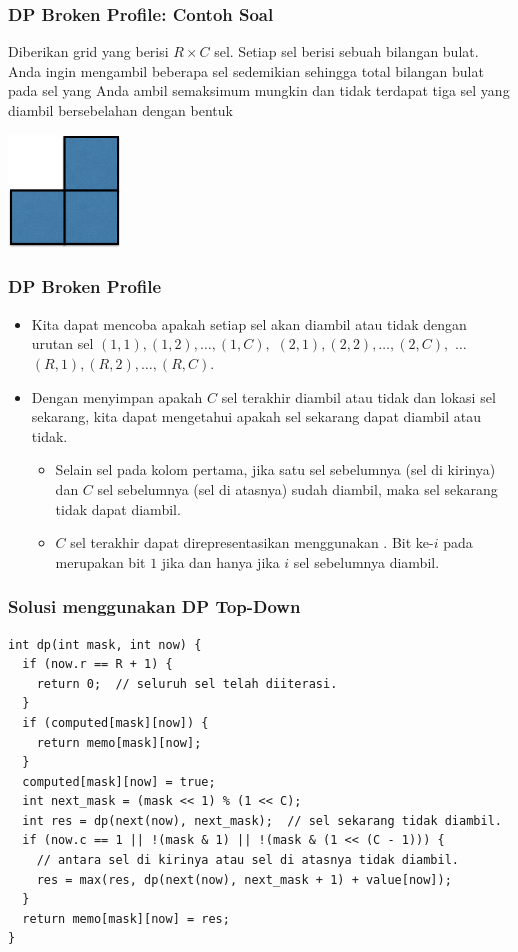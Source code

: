 \begin{frame}
\frametitle{DP Broken Profile: Contoh Soal}
Diberikan grid yang berisi $R \times C$ sel. Setiap sel berisi sebuah bilangan bulat. Anda ingin mengambil beberapa sel sedemikian sehingga total bilangan bulat pada sel yang Anda ambil semaksimum mungkin dan tidak terdapat tiga sel yang diambil bersebelahan dengan bentuk
\newline
\begin{center}
\includegraphics[width=3cm]{asset/shape.png}
\end{center}
\end{frame}

\begin{frame}
\frametitle{DP Broken Profile}
\begin{itemize}
  \item Kita dapat mencoba apakah setiap sel akan diambil atau tidak dengan urutan sel
  \newline
  $(1, 1), (1, 2), \dots, (1, C),$
  \newline
  $(2, 1), (2, 2), \dots, (2, C),$
  \newline
  $\dots$
  \newline
  $(R, 1), (R, 2), \dots, (R, C)$.
  \item Dengan menyimpan apakah $C$ sel terakhir diambil atau tidak dan lokasi sel sekarang, kita dapat mengetahui apakah sel sekarang dapat diambil atau tidak.
  \begin{itemize}
    \item Selain sel pada kolom pertama, jika satu sel sebelumnya (sel di kirinya) dan $C$ sel sebelumnya (sel di atasnya) sudah diambil, maka sel sekarang tidak dapat diambil.
    \item \fState $C$ sel terakhir dapat direpresentasikan menggunakan \fbitmask. Bit ke-$i$ pada \fbitmask merupakan bit $1$ jika dan hanya jika $i$ sel sebelumnya diambil.
  \end{itemize}
\end{itemize}
\end{frame}

\begin{frame}[fragile]
\frametitle{Solusi menggunakan DP Top-Down}
\begin{lstlisting}
int dp(int mask, int now) {
  if (now.r == R + 1) {
    return 0;  // seluruh sel telah diiterasi.
  }
  if (computed[mask][now]) {
    return memo[mask][now];
  }
  computed[mask][now] = true;
  int next_mask = (mask << 1) % (1 << C);
  int res = dp(next(now), next_mask);  // sel sekarang tidak diambil.
  if (now.c == 1 || !(mask & 1) || !(mask & (1 << (C - 1))) {
    // antara sel di kirinya atau sel di atasnya tidak diambil.
    res = max(res, dp(next(now), next_mask + 1) + value[now]);
  }
  return memo[mask][now] = res;
}
\end{lstlisting}
\end{frame}

